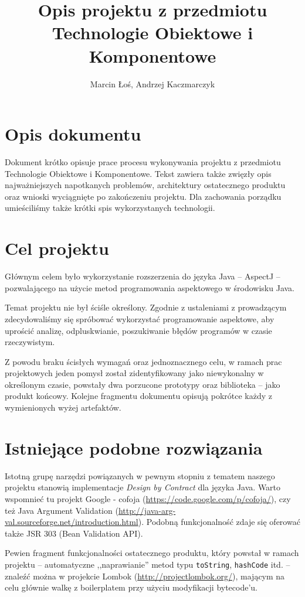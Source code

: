 \documentclass[12pt,a4paper,titlepage]{article}
\title{Opis projektu z przedmiotu Technologie Obiektowe i Komponentowe}
\author{Marcin Łoś, Andrzej Kaczmarczyk}
\begin{document}
\maketitle
\tableofcontents
\newpage
\pagestyle{empty}
\pagestyle{headings}

\section{Opis dokumentu}
 Dokument krótko opisuje prace procesu wykonywania projektu z przedmiotu Technologie Obiektowe i Komponentowe. Tekst zawiera także zwięzły opis najważniejszych napotkanych problemów, architektury ostatecznego produktu oraz wnioski wyciągnięte po zakończeniu projektu. Dla zachowania porządku umieściliśmy także krótki spis wykorzystanych technologii.
 
\section{Cel projektu}
 Głównym celem było wykorzystanie rozszerzenia do języka Java -- AspectJ -- pozwalającego na użycie metod programowania aspektowego w środowisku Java.
 
 Temat projektu nie był ściśle określony. Zgodnie z ustaleniami z prowadzącym zdecydowaliśmy się spróbować wykorzystać programowanie aspektowe, aby uprościć analizę, odpluskwianie, poszukiwanie błędów programów w czasie rzeczywistym.
 
 Z powodu braku ścisłych wymagań oraz jednoznacznego celu, w ramach prac projektowych jeden pomysł został zidentyfikowany jako niewykonalny w określonym czasie, powstały dwa porzucone prototypy oraz biblioteka -- jako produkt końcowy. Kolejne fragmentu dokumentu opisują pokrótce każdy z wymienionych wyżej artefaktów.
 
\section{Istniejące podobne rozwiązania}
Istotną grupę narzędzi powiązanych w pewnym stopniu z tematem naszego projektu stanowią implementacje \emph{Design by Contract} dla języka Java. Warto wspomnieć tu projekt Google - cofoja (\url{https://code.google.com/p/cofoja/}), czy też Java Argument Validation (\url{http://java-arg-val.sourceforge.net/introduction.html}). Podobną funkcjonalność zdaje się oferować także JSR 303 (Bean Validation API).

Pewien fragment funkcjonalności ostatecznego produktu, który powstał w ramach projektu -- automatyczne ,,naprawianie'' metod typu \texttt{toString}, \texttt{hashCode} itd. -- znaleźć można w projekcie Lombok (\url{http://projectlombok.org/}), mającym na celu głównie walkę z boilerplatem przy użyciu modyfikacji bytecode'u.
\end{document}
